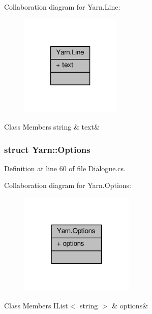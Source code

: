 Collaboration diagram for Yarn.\-Line\-:
\nopagebreak
\begin{figure}[H]
\begin{center}
\leavevmode
\includegraphics[width=136pt]{a00390}
\end{center}
\end{figure}
\begin{DoxyFields}{Class Members}
\hypertarget{a00051_a81d1f04bbb4cf6642d2bd685bda1da20}{string}\label{a00051_a81d1f04bbb4cf6642d2bd685bda1da20}
&
text&
\\
\hline

\end{DoxyFields}
\label{a00380}
\hypertarget{a00051_a00380}{}
\subsubsection{struct Yarn\-:\-:Options}


Definition at line 60 of file Dialogue.\-cs.



Collaboration diagram for Yarn.\-Options\-:
\nopagebreak
\begin{figure}[H]
\begin{center}
\leavevmode
\includegraphics[width=154pt]{a00391}
\end{center}
\end{figure}
\begin{DoxyFields}{Class Members}
\hypertarget{a00051_ae8c616d923ceeeed192a9436c55d9917}{I\-List$<$ string $>$}\label{a00051_ae8c616d923ceeeed192a9436c55d9917}
&
options&
\\
\hline

\end{DoxyFields}
\label{a00373}
\hypertarget{a00051_a00373}{}
